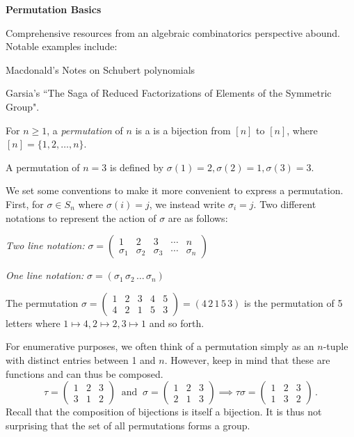
\noindent
{\large \bf Permutation Basics}


Comprehensive resources from an algebraic combinatorics perspective abound.  Notable examples include:

\medskip
\noindent
Macdonald's Notes on Schubert polynomials

\noindent
Garsia's ``The Saga of Reduced Factorizations of Elements of the Symmetric Group".




\begin{definition}
For $n\geq 1$, a {\it permutation} of $n$ is a 
is a bijection from  $[n]$ to $[n]$, where $[n]=\{1,2,\ldots,n\}$.
\end{definition}

\begin{example} 
A permutation of $n=3$ is defined by $\sigma(1)=2,\sigma(2)=1,\sigma(3)=3$.
\end{example}

We set some conventions to make it more convenient to express a permutation.
First, for $\sigma\in S_n$ where $\sigma(i)=j$, we instead write $\sigma_i=j$.
Two different notations to represent the action of $\sigma$ are as follows:

\bigskip
\noindent
{\it Two line notation:}
$\sigma=\left(\begin{matrix}
1&2&3&\cdots&n\\
\sigma_1&\sigma_2&\sigma_3&\cdots&\sigma_n
\end{matrix}
\right)$

\bigskip

\noindent
{\it One line notation:} $\sigma=(\sigma_1\,\sigma_2\,\ldots\,\sigma_n)$

\bigskip

\begin{example}
The permutation 
$\sigma=\left(\begin{matrix}
1&2&3&4&5\\
4&2&1&5&3
\end{matrix}
\right)
= ( 4\,2\,1\,5\,3)
$
is the permutation of 5 letters where $1\mapsto 4, 2\mapsto 2, 3\mapsto 1$ and so forth.
\end{example}

For enumerative purposes, we often think of a permutation simply as an $n$-tuple with 
distinct entries between 1 and $n$.  However, keep in mind that these are functions
and can thus be composed.
$$
\tau=
\begin{pmatrix}
1&2&3\\
3&1&2
\end{pmatrix}
\;\;\text{and} \;\;
\sigma=
\begin{pmatrix}
1&2&3\\
2&1&3
\end{pmatrix}
\implies \tau\sigma=
\begin{pmatrix}
1&2&3\\
1&3&2
\end{pmatrix}
\,.
$$
Recall that the composition of bijections is itself a bijection.  It is thus not surprising 
that the  set of all permutations forms a group.

